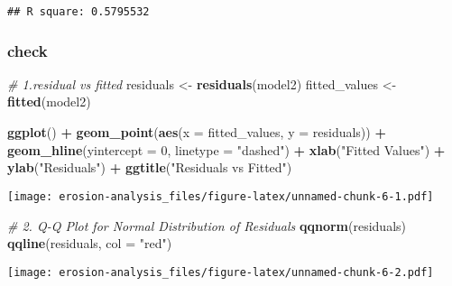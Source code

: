\documentclass[
]{article}
\newenvironment{Shaded}{\begin{snugshade}}{\end{snugshade}}
\newcommand{\AttributeTok}[1]{\textcolor[rgb]{0.13,0.29,0.53}{#1}}
\newcommand{\CommentTok}[1]{\textcolor[rgb]{0.56,0.35,0.01}{\textit{#1}}}
\newcommand{\DecValTok}[1]{\textcolor[rgb]{0.00,0.00,0.81}{#1}}
\newcommand{\FunctionTok}[1]{\textcolor[rgb]{0.13,0.29,0.53}{\textbf{#1}}}
\newcommand{\NormalTok}[1]{#1}
\newcommand{\OtherTok}[1]{\textcolor[rgb]{0.56,0.35,0.01}{#1}}
\newcommand{\SpecialCharTok}[1]{\textcolor[rgb]{0.81,0.36,0.00}{\textbf{#1}}}
\newcommand{\StringTok}[1]{\textcolor[rgb]{0.31,0.60,0.02}{#1}}
\begin{document}
\begin{verbatim}
## R square: 0.5795532
\end{verbatim}

\hypertarget{check-1}{%
\subsubsection{check}\label{check-1}}

\begin{Shaded}
\begin{Highlighting}[]
\CommentTok{\# 1.residual vs fitted}
\NormalTok{residuals }\OtherTok{\textless{}{-}} \FunctionTok{residuals}\NormalTok{(model2)}
\NormalTok{fitted\_values }\OtherTok{\textless{}{-}} \FunctionTok{fitted}\NormalTok{(model2)}

\FunctionTok{ggplot}\NormalTok{() }\SpecialCharTok{+}
  \FunctionTok{geom\_point}\NormalTok{(}\FunctionTok{aes}\NormalTok{(}\AttributeTok{x =}\NormalTok{ fitted\_values, }\AttributeTok{y =}\NormalTok{ residuals)) }\SpecialCharTok{+}
  \FunctionTok{geom\_hline}\NormalTok{(}\AttributeTok{yintercept =} \DecValTok{0}\NormalTok{, }\AttributeTok{linetype =} \StringTok{"dashed"}\NormalTok{) }\SpecialCharTok{+}
  \FunctionTok{xlab}\NormalTok{(}\StringTok{"Fitted Values"}\NormalTok{) }\SpecialCharTok{+}
  \FunctionTok{ylab}\NormalTok{(}\StringTok{"Residuals"}\NormalTok{) }\SpecialCharTok{+}
  \FunctionTok{ggtitle}\NormalTok{(}\StringTok{"Residuals vs Fitted"}\NormalTok{)}
\end{Highlighting}
\end{Shaded}

\texttt{[image: erosion-analysis\_files/figure-latex/unnamed-chunk-6-1.pdf]}

\begin{Shaded}
\begin{Highlighting}[]
\CommentTok{\# 2. Q{-}Q Plot for Normal Distribution of Residuals}
\FunctionTok{qqnorm}\NormalTok{(residuals)}
\FunctionTok{qqline}\NormalTok{(residuals, }\AttributeTok{col =} \StringTok{"red"}\NormalTok{)}
\end{Highlighting}
\end{Shaded}

\texttt{[image: erosion-analysis\_files/figure-latex/unnamed-chunk-6-2.pdf]}
\end{document}
